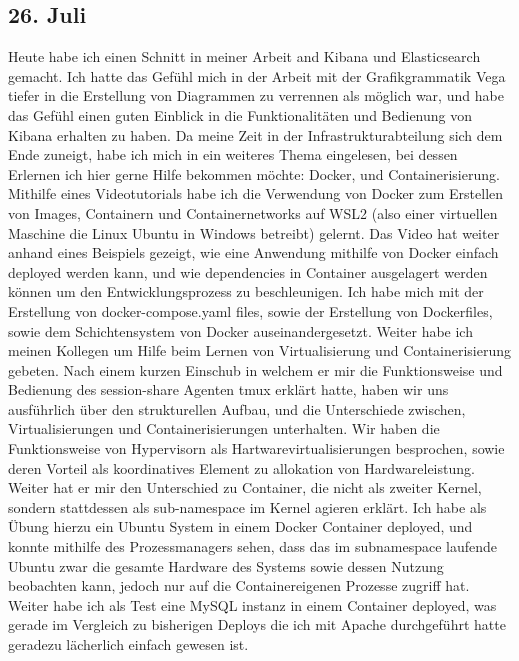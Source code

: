 \subsection{26. Juli}
Heute habe ich einen Schnitt in meiner Arbeit and Kibana und Elasticsearch gemacht. Ich hatte das Gefühl mich in der Arbeit mit der Grafikgrammatik Vega tiefer in die Erstellung von Diagrammen zu verrennen als möglich war, und habe das Gefühl einen guten Einblick in die Funktionalitäten und Bedienung von Kibana erhalten zu haben. Da meine Zeit in der Infrastrukturabteilung sich dem Ende zuneigt, habe ich mich in ein weiteres Thema eingelesen, bei dessen Erlernen ich hier gerne Hilfe bekommen möchte: Docker, und Containerisierung. Mithilfe eines Videotutorials habe ich die Verwendung von Docker zum Erstellen von Images, Containern und Containernetworks auf WSL2 (also einer virtuellen Maschine die Linux Ubuntu in Windows betreibt) gelernt. Das Video hat weiter anhand eines Beispiels gezeigt, wie eine Anwendung mithilfe von Docker einfach deployed werden kann, und wie dependencies in Container ausgelagert werden können um den Entwicklungsprozess zu beschleunigen. Ich habe mich mit der Erstellung von docker-compose.yaml files, sowie der Erstellung von Dockerfiles, sowie dem Schichtensystem von Docker auseinandergesetzt. Weiter habe ich meinen Kollegen um Hilfe beim Lernen von Virtualisierung und Containerisierung gebeten. Nach einem kurzen Einschub in welchem er mir die Funktionsweise und Bedienung des session-share Agenten tmux erklärt hatte, haben wir uns ausführlich über den strukturellen Aufbau, und die Unterschiede zwischen, Virtualisierungen und Containerisierungen unterhalten. Wir haben die Funktionsweise von Hypervisorn als Hartwarevirtualisierungen besprochen, sowie deren Vorteil als koordinatives Element zu allokation von Hardwareleistung. Weiter hat er mir den Unterschied zu Container, die nicht als zweiter Kernel, sondern stattdessen als sub-namespace im Kernel agieren erklärt. Ich habe als Übung hierzu ein Ubuntu System in einem Docker Container deployed, und konnte mithilfe des Prozessmanagers sehen, dass das im subnamespace laufende Ubuntu zwar die gesamte Hardware des Systems sowie dessen Nutzung beobachten kann, jedoch nur auf die Containereigenen Prozesse zugriff hat. Weiter habe ich als Test eine MySQL instanz in einem Container deployed, was gerade im Vergleich zu bisherigen Deploys die ich mit Apache durchgeführt hatte geradezu lächerlich einfach gewesen ist.